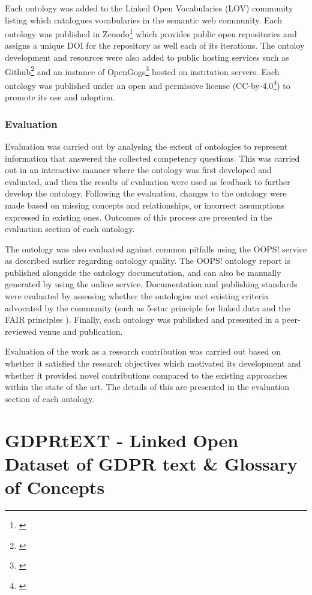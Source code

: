 Each ontology was added to the Linked Open Vocabularies (LOV) community listing which catalogues vocabularies in the semantic web community. Each ontology was published in Zenodo\footnote{\url{}} which provides public open repositories and assigns a unique DOI for the repository as well each of its iterations. The ontoloy development and resources were also added to public hosting services such as Github\footnote{\url{}} and an instance of OpenGogs\footnote{\url{}} hosted on institution servers. Each ontology was published under an open and permissive license (CC-by-4.0\footnote{\url{}}) to promote its use and adoption.

\subsubsection*{Evaluation}
Evaluation was carried out by analysing the extent of ontologies to represent information that answered the collected competency questions. This was carried out in an interactive manner where the ontology was first developed and evaluated, and then the results of evaluation were used as feedback to further develop the ontology. Following the evaluation, changes to the ontology were made based on missing concepts and relationships, or incorrect assumptions expressed in existing ones. Outcomes of this process are presented in the evaluation section of each ontology.

The ontology was also evaluated against common pitfalls using the OOPS! service as described earlier regarding ontology quality. The OOPS! ontology report is published alongside the ontology documentation, and can also be manually generated by using the online service. Documentation and publishing standards were evaluated by assessing whether the ontologies met existing criteria advocated by the community (such as 5-star principle for linked data \cite{} and the FAIR principles \cite{}). Finally, each ontology was published and presented in a peer-reviewed venue and publication.

Evaluation of the work as a research contribution was carried out based on whether it satisfied the research objectives which motivated its development and whether it provided novel contributions compared to the existing approaches within the state of the art. The details of this are presented in the evaluation section of each ontology.

\section{GDPRtEXT - Linked Open Dataset of GDPR text \& Glossary of Concepts}\label{sec:voc:GDPRtEXT}

